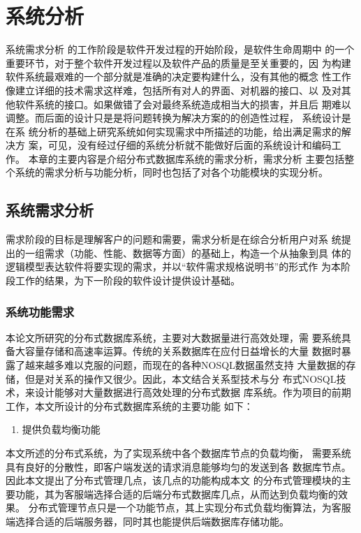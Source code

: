 
\chapter{系统分析}
系统需求分析
的工作阶段是软件开发过程的开始阶段，是软件生命周期中
的一个重要环节，对于整个软件开发过程以及软件产品的质量是至关重要的，因
为构建软件系统最艰难的一个部分就是准确的决定要构建什么，没有其他的概念
性工作像建立详细的技术需求这样难，包括所有对人的界面、对机器的接口、以
及对其他软件系统的接口。如果做错了会对最终系统造成相当大的损害，并且后
期难以调整。而后面的设计只是是将问题转换为解决方案的的创造性过程，
系统设计是在系
统分析的基础上研究系统如何实现需求中所描述的功能，给出满足需求的解决方
案，可见，没有经过仔细的系统分析就不能做好后面的系统设计和编码工作。
本章的主要内容是介绍分布式数据库系统的需求分析，需求分析
主要包括整个系统的需求分析与功能分析，同时也包括了对各个功能模块的实现分析。
\section{系统需求分析}
需求阶段的目标是理解客户的问题和需要，需求分析是在综合分析用户对系
统提出的一组需求（功能、性能、数据等方面）的基础上，构造一个从抽象到具
体的逻辑模型表达软件将要实现的需求，并以“软件需求规格说明书”的形式作
为本阶段工作的结果，为下一阶段的软件设计提供设计基础。
\subsection{系统功能需求}
本论文所研究的分布式数据库系统，主要对大数据量进行高效处理，需
要系统具备大容量存储和高速率运算。传统的关系数据库在应付日益增长的大量
数据时暴露了越来越多难以克服的问题，而现在的各种NOSQL数据虽然支持
大量数据的存储，但是对关系的操作又很少。因此，本文结合关系型技术与分
布式NOSQL技术，来设计能够对大量数据进行高效处理的分布式数据
库系统。作为项目的前期工作，本文所设计的分布式数据库系统的主要功能
如下：


	\begin{enumerate}
		\item 提供负载均衡功能
	\end{enumerate}

	本文所述的分布式系统，为了实现系统中各个数据库节点的负载均衡，
	需要系统具有良好的分散性，即客户端发送的请求消息能够均匀的发送到各
	数据库节点。因此本文提出了分布式管理几点，该几点的功能构成本文
	的分布式管理模块的主要功能，其为客服端选择合适的后端分布式数据库几点，从而达到负载均衡的效果。
	分布式管理节点只是一个功能节点，其上实现分布式负载均衡算法，为客服端选择合适的后端服务器，同时其也能提供后端数据库存储功能。
	

